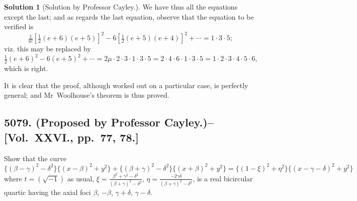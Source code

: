 \documentclass[11pt,a4paper]{article}
\theoremstyle{definition}
\newtheorem*{solution}{Solution}
\begin{document}
\begin{solution}[Solution by Professor Cayley.]
We have thus all the equations except the last; and as regards the last equation, observe that the equation to be verified is
\[
\tfrac{1}{6!}[\tfrac{1}{2}(e+6)(e+5)]^2 - 6[\tfrac{1}{2}(e+5)(e+4)]^2 + \cdots = 1\cdot3\cdot5;
\]
viz. this may be replaced by
\[
\tfrac{1}{2}(e+6)^2 - 6(e+5)^2 + \cdots = 2\mu \cdot 2\cdot3\cdot1\cdot3\cdot5 = 2\cdot4\cdot6\cdot1\cdot3\cdot5 = 1\cdot2\cdot3\cdot4\cdot5\cdot6,
\]
which is right.

It is clear that the proof, although worked out on a particular case, is perfectly general; and Mr~Woolhouse's theorem is thus proved.
\end{solution}

\newpage

\subsection*{5079. (Proposed by Professor Cayley.)\---[Vol.~XXVI., pp.~77, 78.]}

Show that the curve
\[
\{(\beta-\gamma)^2-\delta^2\}\{(x-\beta)^2+y^2\} + \{(\beta+\gamma)^2-\delta^2\}\{(x+\beta)^2+y^2\} = \{(1-\xi)^2+\eta^2\}\{(x-\gamma-\delta)^2+y^2\}
\]
where $t = (\sqrt{-1})$ as usual, $\xi = \frac{\beta^2+\gamma^2-\delta^2}{(\beta+\gamma)^2-\delta^2}$, $\eta = \frac{-2\gamma\delta}{(\beta+\gamma)^2-\delta^2}$, is a real bicircular quartic having the axial foci $\beta$, $-\beta$, $\gamma+\delta$, $\gamma-\delta$.
\end{document}
